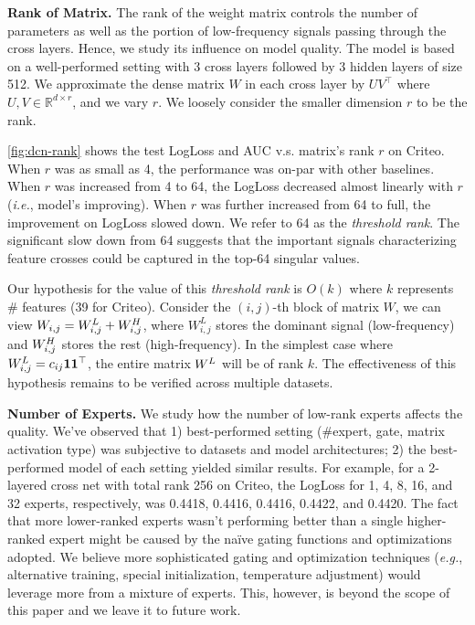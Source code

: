 \documentclass[sigconf]{acmart}
\begin{document}
{\bf Rank of Matrix.}
The rank of the weight matrix controls the number of parameters as well as the portion of low-frequency signals passing through the cross layers. Hence, we study its influence on model quality. The model is based on a well-performed setting with 3 cross layers followed by 3 hidden layers of size 512. We approximate the dense matrix $W$ in each cross layer by $UV^\top$ where $U, V \in \mathbb{R}^{d \times r}$, and we vary $r$. We loosely consider the smaller dimension $r$ to be the rank.

\autoref{fig:dcn-rank} shows the test LogLoss and AUC v.s. matrix's rank $r$ on Criteo. When $r$ was as small as 4, the performance was on-par with other baselines. When $r$ was increased from 4 to 64, the LogLoss decreased almost linearly with $r$ (\emph{i.e.}, model's improving). When $r$ was further increased from 64 to full, the improvement on LogLoss slowed down. We refer to 64 as the \emph{threshold rank}. The significant slow down from 64 suggests that the important signals characterizing feature crosses could be captured in the top-64 singular values.

Our hypothesis for the value of this \emph{threshold rank} is $O(k)$ where $k$ represents \# features (39 for Criteo). Consider the $(i,j)$-th block of matrix $W$, we can view $\small W_{i,j} = W_{i,j}^L + W_{i,j}^H$, where $W_{i,j}^L$ stores the dominant signal (low-frequency) and $\small W_{i,j}^H$ stores the rest (high-frequency). In the simplest case where $\small W_{i,j}^L = c_{ij} {\bf 1} {\bf 1}^\top$, the entire matrix $\small W^L$ will be of rank $k$. The effectiveness of this hypothesis remains to be verified across multiple datasets.

{\bf Number of Experts.}
We study how the number of low-rank experts affects the quality. We've observed that 1) best-performed setting (\#expert, gate, matrix activation type) was subjective to datasets and model architectures; 2) the best-performed model of each setting yielded similar results. For example, for a 2-layered cross net with total rank 256 on Criteo, the LogLoss for 1, 4, 8, 16, and 32 experts, respectively, was 0.4418, 0.4416, 0.4416, 0.4422, and 0.4420. The fact that more lower-ranked experts wasn't performing better than a single higher-ranked expert might be caused by the na\"ive gating functions and optimizations adopted. We believe more sophisticated gating \cite{jang2016categorical, louizos2017learning, ma2019snr} and optimization techniques (\emph{e.g.}, alternative training, special initialization, temperature adjustment) would leverage more from a mixture of experts. This, however, is beyond the scope of this paper and we leave it to future work.
\end{document}
